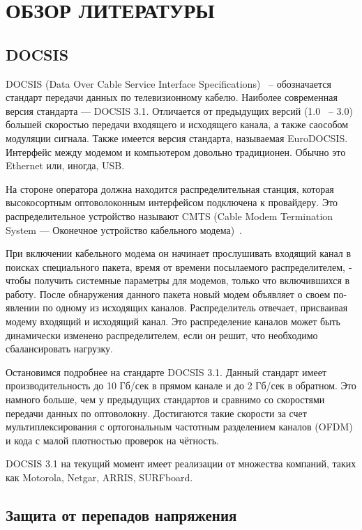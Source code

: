 \section{ОБЗОР ЛИТЕРАТУРЫ}
\label{sec:domain}

\subsection{DOCSIS}

DOCSIS (Data Over Cable Service Interface Specifications) ~-- обозначается стандарт передачи данных по телевизионному кабелю. 
Наиболее современная версия стандарта — DOCSIS 3.1\cite{DOCSIS_tech}. Отличается от предыдущих версий (1.0 ~-- 3.0) большей скоростью передачи
входящего и исходящего канала, а также саособом модуляции сигнала. Также имеется версия стандарта,
называемая EuroDOCSIS. Интерфейс между модемом и компьютером довольно традиционен. Обычно это
Ethernet или, иногда, USB. 

На стороне оператора должна находится распределительная станция, которая 
высокосортным оптоволоконным интерфейсом подключена к провайдеру. Это 
распределительное устройство называют CMTS (Cable Modem Termination System —
Оконечное устройство кабельного модема)~\cite{computer_networks}. 

При включении кабельного модема он начинает прослушивать входящий канал
в поисках специального пакета, время от времени посылаемого распределителем,
­чтобы получить системные параметры для модемов, только что включившихся
в ра­боту. После обнаружения данного пакета новый модем объявляет о своем по-
явлении по одному из исходящих каналов. Распределитель отвечает, присваивая
модему входящий и исходящий канал. Это распределение каналов может быть динамически 
изменено распределителем, если он решит, что необходимо сбалансировать нагрузку.

Остановимся подробнее на стандарте DOCSIS 3.1. Данный стандарт имеет производительность до 10 Гб/сек в прямом канале и до 2 Гб/сек в обратном. 
Это намного больше, чем у предыдущих стандартов и сравнимо со скоростями передачи данных по оптоволокну. Достигаются такие скорости 
за счет мультиплексирования с ортогональным частотным разделением каналов (OFDM) и кода с малой плотностью проверок на чётность.

DOCSIS 3.1 на текущий момент имеет реализации от множества компаний, таких как Motorola, Netgar, ARRIS, SURFboard.

\subsection{Защита от перепадов напряжения}

